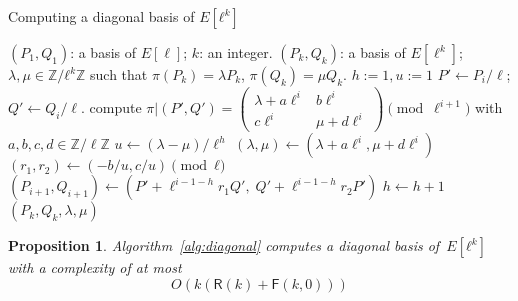 \documentclass{lms}
\newtheorem{prop}[thm]{Proposition}
\def\pa#1{\left(#1\right)}
\def\cout#1{\mathsf{#1}}
\begin{document}
\begin{algorithm}
\caption{\label{alg:diagonal}Computing a diagonal basis of $E[ℓ^k]$}
\begin{algorithmic}[1]
\REQUIRE $(P_1, Q_1 )$: a basis of $E[\ell]$;
$k$: an integer.
\ENSURE $(P_k, Q_k )$: a basis of $E[\ell^k]$;
$λ, μ ∈ ℤ/ℓ^k ℤ$
such that $\pi(P_k)= λ P_k$, $ \pi(Q_k)= μ Q_k$.
\STATE $h:=1, u:=1$
\STATE $P' \leftarrow P_i/\ell$; $Q' \leftarrow Q_i/\ell$.
\STATE compute $\pi|(P',Q')=\left( \begin{array}{cc}
λ + a\ell^{i} & b\ell^{i}\\
c\ell^{i} & μ + d\ell^{i}
\end{array} \right) \pmod {\ell^{i+1}}$
with $a,b,c,d \in \mathbb{Z}/\ell\mathbb{Z}$
\STATE $u \leftarrow (λ -μ)/\ell^h$
\ENDIF
\STATE $(λ, μ) \gets
  (λ + a\ell^i, μ + d\ell^i)$
\STATE $(r_1,r_2) \gets (-b/u , c/u) \pmod{ℓ}$
\STATE $(P_{i+1},Q_{i+1}) \gets
  (P'+\ell^{i-1-h}r_1 Q',\;Q'+\ell^{i-1-h}r_2 P')$
\STATE $h \leftarrow h+1$
\ENDIF
\ENDFOR
\RETURN $(P_{k},Q_{k},λ,μ)$
\end{algorithmic}
\end{algorithm}
\begin{prop}
Algorithm~\ref{alg:diagonal} computes a diagonal basis of~$E[ℓ^k]$
with a complexity of at most
\begin{equation*}
O(k(\mathsf{R}(k)+\mathsf{F}(k,0)))
\end{equation*}

\end{prop}
\end{document}
